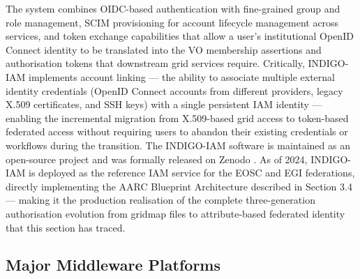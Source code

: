\documentclass[12pt,a4paper]{report}
\begin{document}
The system combines OIDC-based authentication with fine-grained group and role
 management, SCIM provisioning for account lifecycle management across services, and token exchange capabilities that allow a user’s institutional
  OpenID Connect identity to be translated into the VO membership assertions and authorisation tokens that downstream grid services require. 
  Critically, INDIGO-IAM implements account linking — the ability to associate multiple external identity credentials
   (OpenID Connect accounts from different providers, legacy X.509 certificates, and SSH keys) with a single persistent IAM identity — enabling
    the incremental migration from X.509-based grid access to token-based federated access without requiring users to abandon their existing 
    credentials or workflows during the transition. The INDIGO-IAM software is maintained as an open-source project and was formally released on
     Zenodo \parencite{agostini2024indigo}. As of 2024,
      INDIGO-IAM is deployed as the reference IAM service for the EOSC and EGI federations, directly implementing the AARC Blueprint 
      Architecture described in Section 3.4 — making it the production realisation of the complete three-generation authorisation evolution 
      from gridmap files to attribute-based federated identity that this section has traced.

\subsection*{Major Middleware Platforms}
\end{document}
